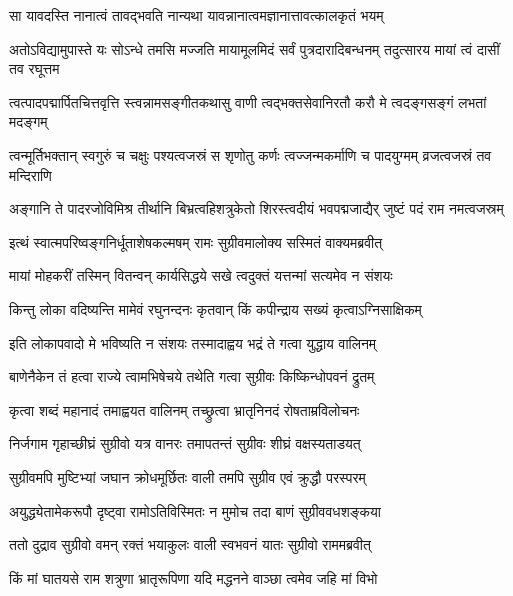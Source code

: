 \twolineshloka
{सा यावदस्ति नानात्वं तावद्भवति नान्यथा}
{यावन्नानात्वमज्ञानात्तावत्कालकृतं भयम्} %

\threelineshloka
{अतोऽविद्यामुपास्ते यः सोऽन्धे तमसि मज्जति}
{मायामूलमिदं सर्वं पुत्रदारादिबन्धनम्}
{तदुत्सारय मायां त्वं दासीं तव रघूत्तम} %

\fourlineindentedshloka
{त्वत्पादपद्मार्पितचित्तवृत्ति\-}
{स्त्वन्नामसङ्गीतकथासु वाणी}
{त्वद्भक्तसेवानिरतौ करौ मे}
{त्वदङ्गसङ्गं लभतां मदङ्गम्} %

\fourlineindentedshloka
{त्वन्मूर्तिभक्तान् स्वगुरुं च चक्षुः}
{पश्यत्वजस्रं स शृणोतु कर्णः}
{त्वज्जन्मकर्माणि च पादयुग्मम्}
{व्रजत्वजस्रं तव मन्दिराणि} %

\fourlineindentedshloka
{अङ्गानि ते पादरजोविमिश्र\-}
{तीर्थानि बिभ्रत्वहिशत्रुकेतो}
{शिरस्त्वदीयं भवपद्मजाद्यैर्\-}
{जुष्टं पदं राम नमत्वजस्रम्} %





\twolineshloka
{इत्थं स्वात्मपरिष्वङ्गनिर्धूताशेषकल्मषम्}
{रामः सुग्रीवमालोक्य सस्मितं वाक्यमब्रवीत्} %

\twolineshloka
{मायां मोहकरीं तस्मिन् वितन्वन् कार्यसिद्धये}
{सखे त्वदुक्तं यत्तन्मां सत्यमेव न संशयः} %

\twolineshloka
{किन्तु लोका वदिष्यन्ति मामेवं रघुनन्दनः}
{कृतवान् किं कपीन्द्राय सख्यं कृत्वाऽग्निसाक्षिकम्} %

\twolineshloka
{इति लोकापवादो मे भविष्यति न संशयः}
{तस्मादाह्वय भद्रं ते गत्वा युद्धाय वालिनम्} %

\twolineshloka
{बाणेनैकेन तं हत्वा राज्ये त्वामभिषेचये}
{तथेति गत्वा सुग्रीवः किष्किन्धोपवनं द्रुतम्} %

\twolineshloka
{कृत्वा शब्दं महानादं तमाह्वयत वालिनम्}
{तच्छ्रुत्वा भ्रातृनिनदं रोषताम्रविलोचनः} %

\twolineshloka
{निर्जगाम गृहाच्छीघ्रं सुग्रीवो यत्र वानरः}
{तमापतन्तं सुग्रीवः शीघ्रं वक्षस्यताडयत्} %

\twolineshloka
{सुग्रीवमपि मुष्टिभ्यां जघान क्रोधमूर्छितः}
{वाली तमपि सुग्रीव एवं क्रुद्धौ परस्परम्} %

\twolineshloka
{अयुद्ध्येतामेकरूपौ दृष्ट्वा रामोऽतिविस्मितः}
{न मुमोच तदा बाणं सुग्रीववधशङ्कया} %

\twolineshloka
{ततो दुद्राव सुग्रीवो वमन् रक्तं भयाकुलः}
{वाली स्वभवनं यातः सुग्रीवो राममब्रवीत्} %

\twolineshloka
{किं मां घातयसे राम शत्रुणा भ्रातृरूपिणा}
{यदि मद्धनने वाञ्छा त्वमेव जहि मां विभो} %

